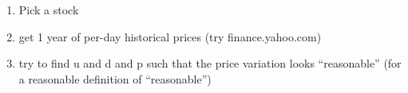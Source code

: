 \documentclass{article}
\begin{document}
\begin{enumerate}
\item Pick a stock
\item get 1 year of per-day historical prices (try finance.yahoo.com)
\item try to find u and d and p such that the price variation looks ``reasonable''
      (for a reasonable definition of ``reasonable'')

\end{enumerate}
\end{document}
